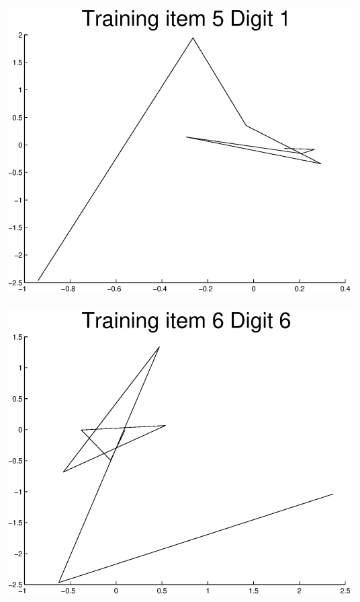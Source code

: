 \documentclass{article}
\begin{document}
	\begin{figure}[H]
	  \begin{subfigure}
	    \centering
	    \includegraphics[scale=0.4]{task1-transformed-digit-5.eps}
	  \end{subfigure}
	  \begin{subfigure}
	    \centering
	    \includegraphics[scale=0.4]{task1-transformed-digit-6.eps}
	  \end{subfigure}
	\end{figure}
\end{document}
